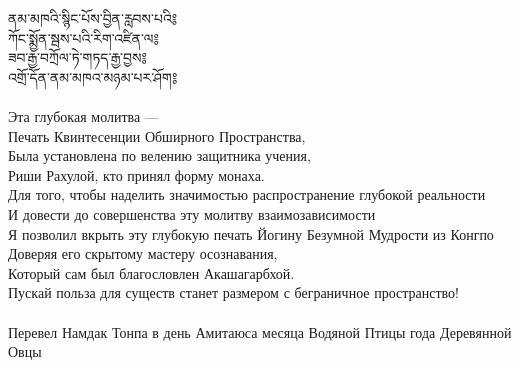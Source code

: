 ནམ་མཁའི་སྙིང་པོས་བྱིན་རླབས་པའི༔\\
ཀོང་སྨྱོན་སྦས་པའི་རིག་འཛིན་ལ༔\\
ཟབ་རྒྱ་བཀྲོལ་ཏེ་གཏད་རྒྱ་བྱས༔\\
འགྲོ་དོན་ནམ་མཁའ་མཉམ་པར་ཤོག༔\\
\\
\ru
Эта глубокая молитва —\\
Печать Квинтесенции Обширного Пространства,\\
Была установлена по велению защитника учения,\\
Риши Рахулой, кто принял форму монаха.\\
Для того, чтобы наделить значимостью распространение глубокой реальности\\
И довести до совершенства эту молитву взаимозависимости\\
Я позволил вкрыть эту глубокую печать Йогину Безумной Мудрости из Конгпо\\
Доверяя его скрытому мастеру осознавания,\\
Который сам был благословлен Акашагарбхой.\\
Пускай польза для существ станет размером с беграничное пространство!\\
\\
\scriptsize Перевел Намдак Тонпа в день Амитаюса месяца Водяной Птицы года Деревянной Овцы\normalsize
